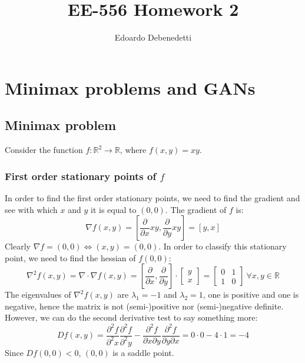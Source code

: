 \documentclass[12pt]{article}
\title{EE-556 Homework 2}
\author{Edoardo Debenedetti}
\begin{document}
\maketitle

\section{Minimax problems and GANs}

\subsection{Minimax problem}

Consider the function $f : \mathbb{R}^2 \rightarrow \mathbb{R}$, where $f(x, y) = xy$.

\subsubsection{First order stationary points of \texorpdfstring{$f$}{Lg}}

In order to find the first order stationary points, we need to find the gradient and see with which $x$ and $y$ it is equal to $(0, 0)$. The gradient of $f$ is:
\begin{equation} \label{eq:f_gradient}
    \nabla f(x, y) = \left [ \frac{\partial}{\partial x} xy, \frac{\partial}{\partial y} xy \right] = [y, x]
\end{equation}
Clearly $\nabla f = (0, 0) \iff (x, y) = (0, 0)$. In order to classify this stationary point, we need to find the hessian of $f(0, 0)$:
\begin{equation} \label{eq:hessian_f}
    \nabla^2f(x, y) = \nabla \cdot \nabla f(x, y) =
        \left [ \frac{\partial}{\partial x}, \frac{\partial}{\partial y} \right]
        \cdot \begin{bmatrix} y \\ x \end{bmatrix} = 
        \begin{bmatrix} 0 & 1 \\ 1 & 0 \end{bmatrix} \ \forall x,  y \in \mathbb{R}
\end{equation}
The eigenvalues of $\nabla^2f(x, y)$ are $\lambda_{1} = -1$ and $\lambda_{2} = 1$, one is positive and one is negative, hence the matrix is not (semi-)positive nor (semi-)negative definite. However, we can do the second derivative test to say something more:
\begin{equation} \label{eq:f_hessian_det}
    Df(x, y) = \frac{\partial^2 f}{\partial^2 x} \frac{\partial^2 f}{\partial^2 y} - 
        \frac{\partial^2 f}{\partial x \partial y} \frac{\partial^2 f}{\partial y \partial x} = 0 \cdot 0 - 4 \cdot 1 = -4
\end{equation}
Since $Df(0, 0) < 0$, $(0, 0)$ is a saddle point.
\end{document}
